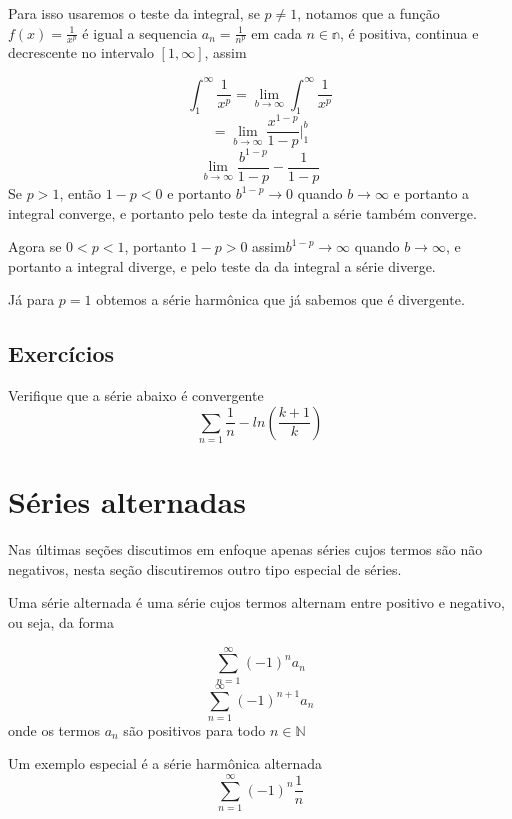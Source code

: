 \begin{resol}
    Para isso usaremos o teste da integral, se $p\neq 1$, notamos que a função 
    $f(x) = \frac{1}{x^p}$ é igual a sequencia $a_n = \frac{1}{n^p}$ em cada 
    $n \in \mathbb{n}$, é positiva, continua e decrescente no intervalo $[1, \infty]$,
    assim

    $$\int_1^{\infty} \frac{1}{x^p} = \lim_{b \rightarrow \infty} \int_1^{\infty} 
    \frac{1}{x^p}$$
    $$ = \lim_{b \rightarrow \infty} \frac{x^{1-p}}{1-p}\bigg|_{1}^b$$
    $$  \lim_{b \rightarrow \infty} \frac{b^{1-p}}{1-p} -\frac{1}{1-p}$$
    Se $p>1$, então $1-p<0$ e portanto $b^{1-p} \to 0$ quando $b \to \infty$
    e portanto a integral converge, e portanto pelo teste da integral a série
    também converge.

    Agora se $0 < p<1$, portanto $1-p>0$ assim$b^{1-p} \to \infty$ quando 
    $b \to \infty$, e portanto a integral diverge, e pelo teste da da integral
    a série diverge.
    
    Já para $p = 1$ obtemos a série harmônica que já sabemos que é divergente.
\end{resol}


\subsection*{Exercícios}

\construirExer

\begin{exer}
    Verifique que a série abaixo é convergente
    $$\sum_{n = 1} \frac{1}{n}-ln(\frac{k+1}{k}) $$
\end{exer}


\section{Séries alternadas}
\construirSec

Nas últimas seções discutimos em enfoque apenas séries cujos termos são não
negativos, nesta seção discutiremos outro tipo especial de séries.

Uma série alternada é uma série cujos termos alternam entre positivo e negativo,
ou seja, da forma 

$$\sum_{n =1}^{\infty} (-1)^n a_n$$
$$\sum_{n =1}^{\infty} (-1)^{n+1} a_n$$
onde os termos $a_n$ são positivos para todo $n \in \mathbb{N}$
\begin{ex}
    Um exemplo especial é a série harmônica alternada
    $$\sum_{n =1}^{\infty} (-1)^n \frac{1}{n}$$
\end{ex}

